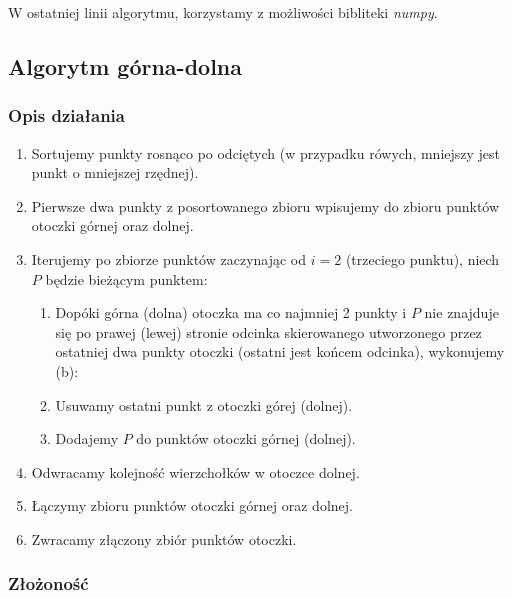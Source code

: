 \documentclass[11pt]{article}
\theoremstyle{remark} \newtheorem{definition}{def.}
\theoremstyle{definition} \newtheorem{twierdzenie}{tw.}
\begin{document}
    W ostatniej linii algorytmu, korzystamy z możliwości bibliteki \emph{numpy}.\\


\subsection{Algorytm górna-dolna}
    \subsubsection{Opis działania}
    \begin{enumerate}
        \item   Sortujemy punkty rosnąco po odciętych (w przypadku rówych, mniejszy jest punkt o mniejszej rzędnej).
        \item   Pierwsze dwa punkty z posortowanego zbioru wpisujemy do zbioru punktów otoczki górnej oraz dolnej.
        \item   Iterujemy po zbiorze punktów zaczynając od $i = 2$ (trzeciego punktu), niech $P$ będzie bieżącym punktem:
                \begin{enumerate}
                    \item   Dopóki górna (dolna) otoczka ma co najmniej 2 punkty i $P$ nie znajduje się po prawej (lewej) stronie odcinka skierowanego utworzonego przez ostatniej
                            dwa punkty otoczki (ostatni jest końcem odcinka), wykonujemy (b):
                    \item   Usuwamy ostatni punkt z otoczki górej (dolnej).
                    \item   Dodajemy $P$ do punktów otoczki górnej (dolnej).
                \end{enumerate}
        \item   Odwracamy kolejność wierzchołków w otoczce dolnej.
        \item   Łączymy zbioru punktów otoczki górnej oraz dolnej.
        \item   Zwracamy złączony zbiór punktów otoczki. 
    \end{enumerate}


    \subsubsection{Złożoność}
    
\end{document}
